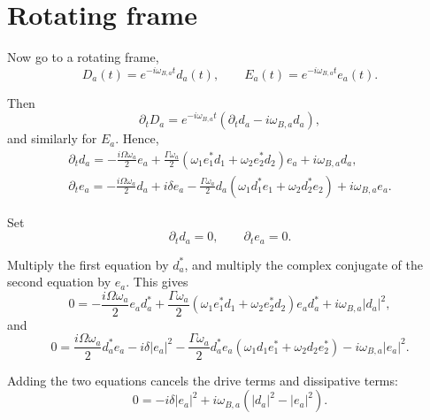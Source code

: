 \documentclass[11pt]{article}
\begin{document}

\section{Rotating frame}

Now go to a rotating frame,
\begin{equation}
D_a(t)
=
e^{-i\omega_{B,a} t}d_a(t),
\qquad
E_a(t)
=
e^{-i\omega_{B,a} t}e_a(t).
\end{equation}

Then
\begin{equation}
\partial_t D_a
=
e^{-i\omega_{B,a} t}
(
\partial_t d_a
-
i\omega_{B,a} d_a
),
\end{equation}
and similarly for \(E_a\). Hence,
\begin{equation}
\begin{gathered}
\partial_t d_a
=
-\frac{i\Omega\omega_a}{2}e_a
+
\frac{\Gamma \omega_a}{2}
(
\omega_1 e_1^{*}d_1
+
\omega_2 e_2^{*}d_2
)
e_a
+
i\omega_{B,a} d_a,
\\
\partial_t e_a
=
-\frac{i\Omega\omega_a}{2}d_a
+
i\delta e_a
-
\frac{\Gamma \omega_a}{2}
d_a
(
\omega_1 d_1^{*}e_1
+
\omega_2 d_2^{*}e_2
)
+
i\omega_{B,a} e_a.
\end{gathered}
\end{equation}

Set
\begin{equation}
\partial_t d_a=0,
\qquad
\partial_t e_a=0.
\end{equation}

Multiply the first equation by \(d_a^{*}\), and multiply the complex conjugate of the second equation by \(e_a\). This gives
\begin{equation}
0
=
-\frac{i\Omega\omega_a}{2}e_a d_a^{*}
+
\frac{\Gamma \omega_a}{2}
(
\omega_1 e_1^{*}d_1
+
\omega_2 e_2^{*}d_2
)
e_a d_a^{*}
+
i\omega_{B,a} |d_a|^2,
\end{equation}
and
\begin{equation}
0
=
\frac{i\Omega\omega_a}{2}d_a^{*}e_a
-
i\delta |e_a|^2
-
\frac{\Gamma \omega_a}{2}
d_a^{*}e_a
(
\omega_1 d_1e_1^{*}
+
\omega_2 d_2e_2^{*}
)
-
i\omega_{B,a} |e_a|^2.
\end{equation}

Adding the two equations cancels the drive terms and dissipative terms:
\begin{equation}
0
=
-i\delta |e_a|^2
+
i\omega_{B,a}
(
|d_a|^2-|e_a|^2
).
\end{equation}
\end{document}
